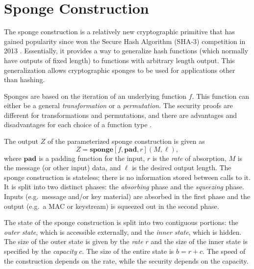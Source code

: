 \section{Sponge Construction}
\label{sec:SpongeAndDuplex}
The sponge construction is a relatively new cryptographic primitive that has gained popularity since \Keccak won the Secure Hash Algorithm (SHA-3) competition in 2013 \cite{Bertoni2011_KeccakReference}\cite{NIST2012_SHA3_Winner}.
Essentially, it provides a way to generalize hash functions (which normally have outputs of fixed length) to functions with arbitrary length output.
This generalization allows cryptographic sponges to be used for applications other than hashing.

Sponges are based on the iteration of an underlying function $f$.
This function can either be a general \emph{transformation} or a \emph{permutation}.
The security proofs are different for transformations and permutations, and there are advantages and disadvantages for each choice of a function type \cite{Bertoni2011_SpongeFunctions}.

The output $Z$ of the parameterized sponge construction is given as
\begin{equation*}
\label{eq:SpongeOutput}
Z = \mathbf{sponge}[f,\mathbf{pad},r](M,\ell),
\end{equation*}
where $\mathbf{pad}$ is a padding function for the input, $r$ is the \emph{rate} of absorption, $M$ is the message (or other input) data, and $\ell$ is the desired output length.
The sponge construction is stateless; there is no information stored between calls to it.
It is split into two distinct phases: the \emph{absorbing} phase and the \emph{squeezing} phase.
Inputs (e.g.\ message and/or key material) are absorbed in the first phase and the output (e.g.\ a MAC or keystream) is squeezed out in the second phase.

The state of the sponge construction is split into two contiguous portions: the \emph{outer state}, which is accessible externally, and the \emph{inner state}, which is hidden.
The size of the outer state is given by the \emph{rate} $r$ and the size of the inner state is specified by the \emph{capacity} $c$.
The size of the entire state is $b = r + c$.
The speed of the construction depends on the rate, while the security depends on the capacity.

